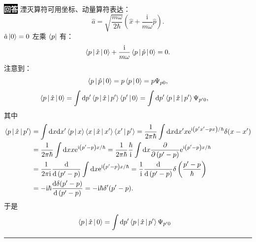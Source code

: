 \documentclass[11pt,a4paper]{ctexart}
\newenvironment{answer}
  {\par\smallskip\noindent
   \begingroup
   \setlength{\fboxsep}{4pt}%
   \colorbox{black}{\textcolor{white}{\bfseries 回答}}%
   \endgroup
   \quad\ignorespaces}
  {\par\smallskip\noindent\rule{\linewidth}{0.4pt}\medskip}
\begin{document}
\begin{answer}
  湮灭算符可用坐标、动量算符表达：
  \begin{equation}
    \hat{a} = \sqrt{\frac{m\omega }{2\hbar } } \left(\hat{x} + \frac{\mathrm{i} }{m\omega } \hat{p} \right).
  \end{equation}
  $\hat{a} \Ket{0 } = 0 $ 左乘 $\Bra{p } $ 有：
  \begin{equation}
    \Braket{p | \hat{x} | 0 } + \frac{\mathrm{i} }{m\omega } \Braket{p | \hat{p} | 0 }
    =0.
  \end{equation}
  注意到：
  \begin{equation}
    \Braket{p | \hat{p} | 0 } = p \Braket{p | 0 } = p \Psi_{p0},
  \end{equation}
  \begin{equation}
    \begin{aligned}
      \Braket{p | \hat{x} | 0 }
      &=\int \mathrm{d}p' \Braket{p|\hat{x}|p' } \Braket{p'|0 }
      =\int \mathrm{d}p' \Braket{p|\hat{x}|p' } \Psi_{p'0},
    \end{aligned}
  \end{equation}
  其中
  \begin{equation}
    \begin{aligned}
      \Braket{p|\hat{x}|p' }
      &=\int \mathrm{d}x \mathrm{d}x' \Braket{p|x }\Braket{x|\hat{x}|x' } \Braket{x'|p' }
      =\frac{1 }{2\pi \hbar } \int \mathrm{d}x\mathrm{d}x' x \mathrm{e}^{\mathrm{i}\left(p'x'-px \right)/\hbar} \delta(x-x') \\
      &=\frac{1 }{2\pi\hbar } \int \mathrm{d}x x\mathrm{e}^{\mathrm{i}\left(p'-p \right)x/\hbar}
      =\frac{1 }{2\pi\hbar } \frac{\hbar }{\mathrm{i} }  \int \mathrm{d}x \frac{\partial }{\partial \left(p'-p \right) } \mathrm{e}^{\mathrm{i}\left(p'-p \right)x/\hbar} \\
      &=\frac{1 }{2\pi \mathrm{i} } \frac{\mathrm{d} }{\mathrm{d}\left(p'-p \right) } \int \mathrm{d}x \mathrm{e}^{\mathrm{i}\left(p'-p \right)x/\hbar}
      =\frac{1 }{\mathrm{i} } \frac{\mathrm{d} }{\mathrm{d}\left(p'-p \right) } \delta\left(\frac{p'-p }{\hbar }  \right) \\
      &=-\mathrm{i}\hbar \frac{\mathrm{d}\delta(p'-p) }{\mathrm{d}\left(p'-p \right) }
      =-\mathrm{i}\hbar \delta'(p'-p).
    \end{aligned}
  \end{equation}
  于是
  \begin{equation}
    \begin{aligned}
      \Braket{p | \hat{x} | 0 }
      &=\int \mathrm{d}p' \Braket{p|\hat{x}|p' } \Psi_{p'0}

\end{aligned}
\end{equation}
\end{answer}
\end{document}
